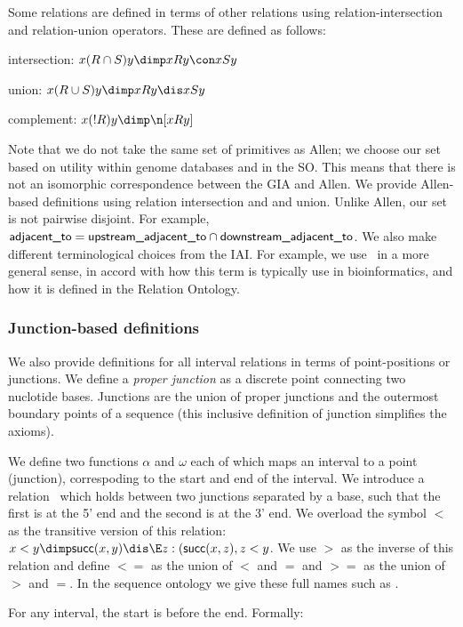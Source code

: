 \documentclass{article}
\def\succ{\pr{succ}}
\def\upstreamOfJ{\pr{before}}
\def\adjacentTo{\pr{adjacent\_to}}
\def\upstreamAdjacentTo{\pr{upstream\_adjacent\_to}}
\def\downstreamAdjacentTo{\pr{downstream\_adjacent\_to}}
\def\overlaps{\pr{overlaps}}
\begin{document}
Some relations are defined in terms of other relations using
relation-intersection and relation-union operators. These are defined as follows:

intersection: $ x (R \cap S) y \dimp x R y \con x S y$

union: $ x (R \cup S) y \dimp x R y \dis x S y$

complement: $ x (!R) y \dimp \n [ x R y ]$

Note that we do not take the same set of primitives as Allen; we
choose our set based on utility within genome databases and in the
SO. This means that there is not an isomorphic correspondence between
the GIA and Allen. We provide Allen-based definitions using relation
intersection and and union. Unlike Allen, our set is not pairwise
disjoint. For example, $\adjacentTo = \upstreamAdjacentTo \cap
\downstreamAdjacentTo$. We also make different terminological choices
from the IAI. For example, we use \overlaps\ in a more general sense,
in accord with how this term is typically use in bioinformatics, and
how it is defined in the Relation Ontology.

\subsubsection{Junction-based definitions}

We also provide definitions for all interval relations in terms of
point-positions or junctions. We define a \emph{proper junction} as a
discrete point connecting two nuclotide bases. Junctions are the union
of proper junctions and the outermost boundary points of a sequence
(this inclusive definition of junction simplifies the axioms).

We define two functions $\alpha$ and $\omega$ each of which maps an
interval to a point (junction), correspoding to the start and end of
the interval. We introduce a relation \succ\ which holds between two
junctions separated by a base, such that the first is at the 5' end
and the second is at the 3' end. We overload the symbol $<$ as the
transitive version of this relation: $x<y \dimp \succ(x,y) \dis \E z:
(\succ(x,z),z<y$. We use $>$ as the inverse of this relation and
define $<=$ as the union of $<$ and $=$ and $>=$ as the union of $>$
and $=$. In the sequence ontology we give these full names such as
\upstreamOfJ.

For any interval, the start is before the end. Formally:
\end{document}
